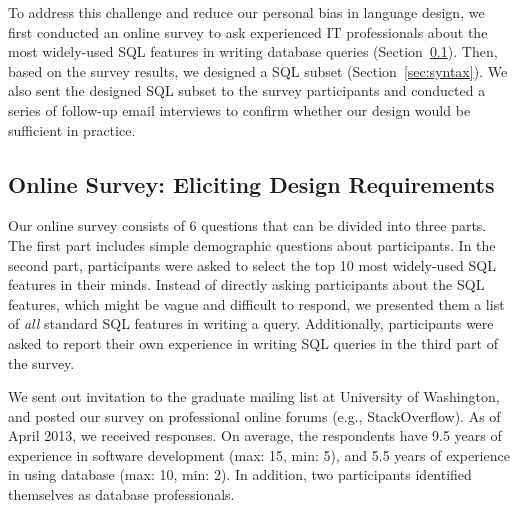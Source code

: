 To address this challenge and reduce our personal bias
in language design, we first conducted an online survey
to ask experienced IT professionals about the most widely-used
SQL features in writing database queries (Section~\ref{sec:survey}).
Then, based on the survey results, we designed
a SQL subset (Section~\ref{sec:syntax}).  
We also sent the designed SQL subset to the survey participants
and conducted a series of follow-up email interviews
to confirm whether our design would be sufficient in practice.









\subsection{Online Survey: Eliciting Design Requirements}
\label{sec:survey}


Our online survey consists of 6 questions that can be
divided into three parts. The first part includes
simple demographic questions about participants.
In the second part, participants were asked to select
the top 10 most widely-used SQL features in their minds.
Instead of directly asking participants about the SQL
features, which might be vague and difficult to respond,
we presented them a list of \textit{all} standard
SQL features in writing a query.
Additionally, participants were asked to report their 
own experience in writing SQL queries in the third part of the survey.



We sent out invitation to the graduate mailing list at
University of Washington, and posted our survey on
professional online forums (e.g., StackOverflow).
As of April 2013, we received \respnum responses.
On average, the respondents have 9.5 years of experience
in software development (max: 15, min: 5),
and 5.5 years of experience in
using database (max: 10, min: 2). In addition, two
participants identified themselves as database professionals.

